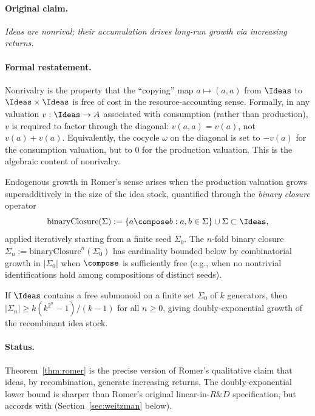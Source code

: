 \paragraph{Original claim.} \emph{Ideas are nonrival; their accumulation
drives long-run growth via increasing returns.}

\paragraph{Formal restatement.} Nonrivalry is the property that the
``copying'' map $a\mapsto (a,a)$ from $\Ideas$ to $\Ideas\times\Ideas$
is free of cost in the resource-accounting sense. Formally, in any
valuation $v:\Ideas\to A$ associated with consumption (rather than
production), $v$ is required to factor through the diagonal: $v(a,a) =
v(a)$, not $v(a) + v(a)$. Equivalently, the cocycle $\omega$ on the
diagonal is set to $-v(a)$ for the consumption valuation, but to $0$
for the production valuation. This is the algebraic content of
nonrivalry.

Endogenous growth in Romer's sense arises when the production
valuation grows superadditively in the size of the idea stock,
quantified through the \emph{binary closure} operator
\[
  \mathrm{binaryClosure}(\Sigma) := \{a\compose b : a,b\in\Sigma\}\cup\Sigma
  \subset \Ideas,
\]
applied iteratively starting from a finite seed $\Sigma_0$. The
$n$-fold binary closure $\Sigma_n := \mathrm{binaryClosure}^n(\Sigma_0)$
has cardinality bounded below by combinatorial growth in $|\Sigma_0|$
when $\compose$ is sufficiently free (e.g., when no nontrivial
identifications hold among compositions of distinct seeds).

\begin{theorem}
\label{thm:romer}
If $\Ideas$ contains a free submonoid on a finite set $\Sigma_0$ of $k$
generators, then $|\Sigma_n| \geq k(k^{2^n}-1)/(k-1)$ for all $n\geq 0$,
giving doubly-exponential growth of the recombinant idea stock.
\end{theorem}

\paragraph{Status.} Theorem~\ref{thm:romer} is the precise version of
Romer's qualitative claim that ideas, by recombination, generate
increasing returns. The doubly-exponential lower bound is sharper than
Romer's original linear-in-$R\&D$ specification, but accords with
\citet{Weitzman1998} (Section~\ref{sec:weitzman} below).

